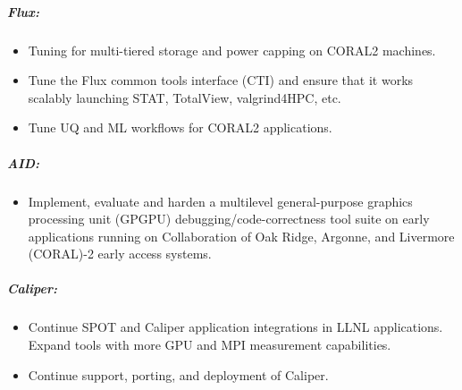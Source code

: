 \subparagraph{Flux:}

\begin{itemize}
\item Tuning for multi-tiered storage and power capping on CORAL2 machines.
\item Tune the Flux common tools interface (CTI) and ensure that it works scalably
      launching STAT, TotalView, valgrind4HPC, etc.
\item Tune UQ and ML workflows for CORAL2 applications.
\end{itemize}

\subparagraph{AID:}
\begin{itemize}
\item Implement, evaluate and harden a multilevel general-purpose graphics processing unit (GPGPU) debugging/code-correctness tool suite on early applications running on Collaboration of Oak Ridge, Argonne, and Livermore (CORAL)-2 early access systems.
\end{itemize}

\subparagraph{Caliper:}
\begin{itemize}
\item Continue SPOT and Caliper application integrations in LLNL applications. Expand tools with more GPU and MPI measurement capabilities.
\item Continue support, porting, and deployment of Caliper.
\end{itemize}
